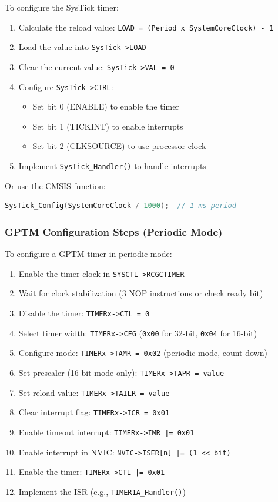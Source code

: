 To configure the SysTick timer:

\begin{enumerate}[nosep]
  \item Calculate the reload value: \texttt{LOAD = (Period x SystemCoreClock) - 1}
  \item Load the value into \texttt{SysTick->LOAD}
  \item Clear the current value: \texttt{SysTick->VAL = 0}
  \item Configure \texttt{SysTick->CTRL}:
    \begin{itemize}[nosep]
      \item Set bit 0 (ENABLE) to enable the timer
      \item Set bit 1 (TICKINT) to enable interrupts
      \item Set bit 2 (CLKSOURCE) to use processor clock
    \end{itemize}
  \item Implement \texttt{SysTick\_Handler()} to handle interrupts
\end{enumerate}

\noindent
Or use the CMSIS function:
\begin{lstlisting}[language=C]
SysTick_Config(SystemCoreClock / 1000);  // 1 ms period
\end{lstlisting}

\subsubsection{GPTM Configuration Steps (Periodic Mode)}

To configure a GPTM timer in periodic mode:

\begin{enumerate}[nosep]
  \item Enable the timer clock in \texttt{SYSCTL->RCGCTIMER}
  \item Wait for clock stabilization (3 NOP instructions or check ready bit)
  \item Disable the timer: \texttt{TIMERx->CTL = 0}
  \item Select timer width: \texttt{TIMERx->CFG} (\texttt{0x00} for 32-bit, \texttt{0x04} for 16-bit)
  \item Configure mode: \texttt{TIMERx->TAMR = 0x02} (periodic mode, count down)
  \item Set prescaler (16-bit mode only): \texttt{TIMERx->TAPR = value}
  \item Set reload value: \texttt{TIMERx->TAILR = value}
  \item Clear interrupt flag: \texttt{TIMERx->ICR = 0x01}
  \item Enable timeout interrupt: \texttt{TIMERx->IMR |= 0x01}
  \item Enable interrupt in NVIC: \texttt{NVIC->ISER[n] |= (1 << bit)}
  \item Enable the timer: \texttt{TIMERx->CTL |= 0x01}
  \item Implement the ISR (e.g., \texttt{TIMER1A\_Handler()})
\end{enumerate}

